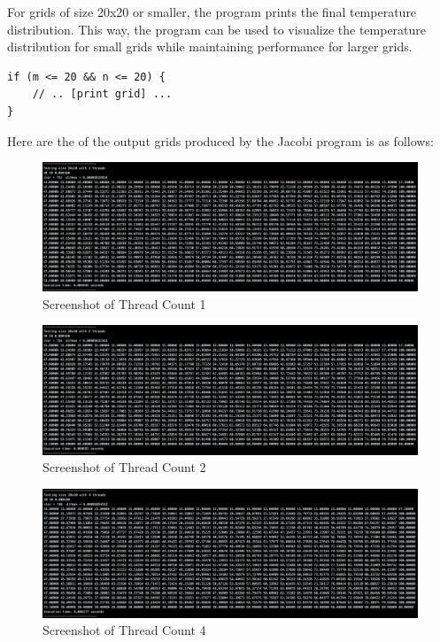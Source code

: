 \documentclass{article}
\begin{document}
For grids of size 20x20 or smaller, the program prints the final temperature distribution. This way, the program can be used to visualize the temperature distribution for small grids while maintaining performance for larger grids.

\begin{lstlisting}[style=CStyle, caption={Conditional Printing of Grid Values}]
if (m <= 20 && n <= 20) {
    // .. [print grid] ...
}
\end{lstlisting}

Here are the of the output grids produced by the Jacobi program is as follows:

\begin{figure}[H]
    \centering
    \includegraphics[width=\linewidth]{Images/Thread1.png}
    \caption{Screenshot of Thread Count 1}
    \label{fig:thread1}
\end{figure}

\begin{figure}[H]
    \centering
    \includegraphics[width=\linewidth]{Images/Thread2.png}
    \caption{Screenshot of Thread Count 2}
    \label{fig:thread2}
\end{figure}

\begin{figure}[H]
    \centering
    \includegraphics[width=\linewidth]{Images/Thread4.png}
    \caption{Screenshot of Thread Count 4}
    \label{fig:thread4}
\end{figure}
\end{document}
